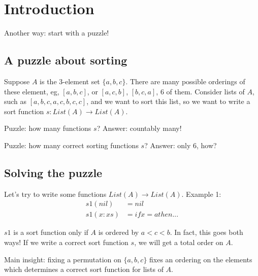 \section{Introduction}
\label{sec:introduction}

Another way: start with a puzzle!

\subsection*{A puzzle about sorting}

Suppose $A$ is the 3-element set $\{a,b,c\}$. There are many possible orderings of these element, eg, $[a,b,c]$, or $[a,c,b]$, $[b,c,a]$, 6 of them. Consider lists of $A$, such as $[a,b,c,a,c,b,c,c]$, and we want to sort this list, so we want to write a sort function $s\colon List(A) \to List(A)$. 

Puzzle: how many functions $s$? Answer: countably many!

Puzzle: how many correct sorting functions $s$? Answer: only 6, how?

\subsection*{Solving the puzzle}

Let's try to write some functions $List(A) \to List(A)$.
Example 1:
\begin{align*}
    s1(nil) &= nil \\
    s1(x:xs) &= if x = a then ...
\end{align*}

$s1$ is a sort function only if $A$ is ordered by $a < c < b$.
In fact, this goes both ways!
If we write a correct sort function $s$, we will get a total order on $A$.


Main insight: fixing a permutation on $\{a,b,c\}$ fixes an ordering on the elements which determines a correct sort function for lists of $A$.

